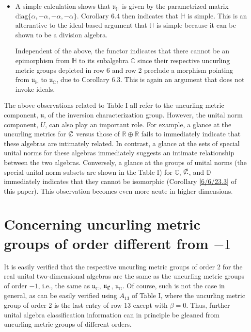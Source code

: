 \documentclass{amsart}
\numberwithin{equation}{section}
\theoremstyle{definition}
\numberwithin{theorem}{section}
\begin{document}
\begin{itemize}
 $ \left\{\left[\begin{array}{ccc}
0  & 0 & w   \\
 0 & 0 & 0 \\
 0 & 0 & 0    
\end{array}\right]:w\in\mathbb{R} \right\} $. Accordingly, there must exist a morphism between $\mathfrak{u}_{A_{11}}$ and $\mathfrak{u}_{\mathbb{D}}$  - and it clearly does by inspection of the depicted uncurling metric algebras at the end of rows 11 and 5.  
 \item A simple calculation shows that $\mathfrak{u}_{\mathbb{H}}$ is given by the parametrized matrix $\text{diag}\{\alpha,-\alpha,-\alpha,-\alpha\}$.  Corollary 6.4 then indicates that  $\mathbb{H}$ is simple.  This is an alternative to the ideal-based argument that $\mathbb{H}$ is simple because it can be shown to be a division algebra.

Independent of the above, the functor indicates that there cannot be an epimorphism from  $\mathbb{H}$ to its subalgebra $\mathbb{C}$ since 	their respective uncurling metric groups depicted in row 6 and row 2 preclude a morphism pointing from $\mathfrak{u}_{\mathbb{H}}$ to $\mathfrak{u}_{\mathbb{C}}$, due to Corollary 6.3.  This is again an argument that does not invoke ideals.
\end{itemize}


 The above observations related to Table I all refer to the uncurling metric component, $\mathfrak{u}$, of the inversion characterization group.  However, the unital norm component, $U$, can also play an important role.  For example, a glance at the uncurling metrics for $\slashed{\mathbb{C}}$ versus those of $\mathbb{R}\oplus\mathbb{R}$ fails to immediately indicate that these algebras are intimately related.   In contrast, a glance at the sets of special unital norms for these algebras immediately suggests an intimate relationship between the two algebras. Conversely, a glance at the groups of unital norms (the special unital norm subsets are shown in the Table I) for $\mathbb{C}$, $\slashed{\mathbb{C}}$, and $\mathbb{D}$ immediately indicates that they cannot be isomorphic (Corollary \ref{6/6/23.3} of this paper).  This observation becomes even more acute in higher dimensions.  
 
 \section{Concerning uncurling metric groups of order different from $-1$}
It is easily verified that the respective uncurling metric groups of order 2 for the real unital two-dimensional algebras are the same as the uncurling metric groups of order $-1$, i.e., the same as  $\mathfrak{u}_{\mathbb{C}}$, $\mathfrak{u}_{\slashed{\mathbb{C}}}$, $\mathfrak{u}_{\mathbb{D}}$.  Of course, such is not the case in general, as can be easily verified using $A_{13}$ of Table I, where the uncurling metric group of order 2 is the last entry of row 13 except with $\beta=0$.  Thus, further unital algebra classification information can in principle be gleaned from uncurling metric groups of different orders.
\end{document}
